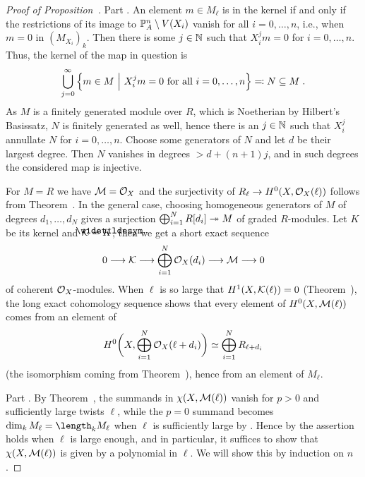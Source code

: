 \documentclass[a4paper,parskip=half,numbers=enddot, DIV=12]{scrreprt}
\begin{document}
\begin{proof}[Proof of Proposition~]
	Part . An element $m\in M_\ell$ is in the kernel if and only if the restrictions of its image to $\mathbb{P}_A^n\setminus V(X_i)$ vanish for all $i=0,\ldots,n$, i.e., when $m=0$ in $(M_{X_i})_k$. Then there is some $j\in\mathbb{N}$ such that $X_i^j m=0$ for $i=0,\ldots,n$. Thus, the kernel of the map in question is
	\begin{align*}
		\bigcup_{j=0}^\infty\left\{m\in M\ \middle|\  X_i^jm=0\text{ for all }i=0,\ldots,n\right\}\eqqcolon N\subseteq M\;.
	\end{align*}
	As $M$ is a finitely generated module over $R$, which is Noetherian by Hilbert's Basissatz, $N$ is finitely generated as well, hence there is an $j\in\mathbb{N}$ such that $X_i^j$ annullate $N$ for $i=0,\ldots,n$. Choose some generators of $N$ and let $d$ be their largest degree. Then $N$ vanishes in degrees $>d+(n+1)j$, and in such degrees the considered map is injective.
	
	For $M=R$ we have $\mathcal{M}=\mathcal{O}_X$ and the surjectivity of $R_\ell\morphism H^0(X,\Oo_X(\ell))$ follows from Theorem~. In the general case, choosing homogeneous generators of $M$ of degrees $d_1,\ldots,d_N$ gives a surjection $\bigoplus_{i=1}^NR[d_i]\epimorphism M$ of graded $R$-modules. Let $K$ be its kernel and $\Kk=\snake{K}$, then we get a short exact sequence
	\begin{align*}
		0\morphism\Kk\morphism\bigoplus_{i=1}^N\Oo_X(d_i)\morphism \Mm\morphism 0
	\end{align*}
	of coherent $\mathcal{O}_X$-modules. When $\ell$ is so large that $H^1(X,\mathcal{K}(\ell))=0$ (Theorem~), the long exact cohomology sequence shows that every element of $H^0(X,\mathcal{M}(\ell))$ comes from an element of
	\begin{align*}
		 H^0\bigg(X,\bigoplus_{i=1}^N\mathcal{O}_X(\ell+d_i)\bigg)\simeq\bigoplus_{i=1}^NR_{\ell+d_i} 
	\end{align*}
	(the isomorphism coming from Theorem~), hence from an element of $M_\ell$.
	
	Part . By Theorem~, the summands in $\chi(X,\mathcal{M}(\ell))$ vanish for $p>0$ and sufficiently large twists $\ell$, while the $p=0$ summand becomes $\dim_kM_\ell=\length_kM_\ell$ when $\ell$ is sufficiently large by . Hence by \cite[Theorem~18]{alg2} the assertion holds when $\ell$ is large enough, and in particular, it suffices to show that $\chi(X,\mathcal{M}(\ell))$ is given by a polynomial in $\ell$. We will show this by induction on $n$.
	

\end{proof}
\end{document}
